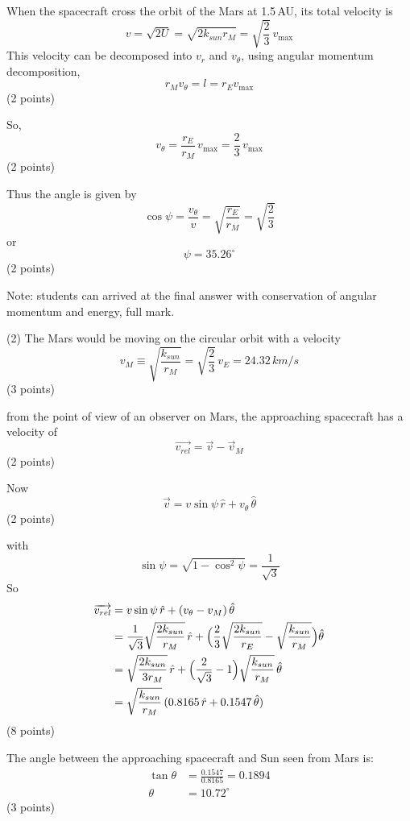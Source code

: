 When the spacecraft cross the orbit of the Mars at 1.5\,AU, its total velocity
is
\[
  v = \sqrt{2U} = \sqrt{2k_{sun}r_M} = \sqrt{\frac{2}{3}}\,v_{\max}
\]
This velocity can be decomposed into $v_r$ and $v_\theta$, using angular
momentum decomposition,
\[
  r_M v_\theta = l = r_E v_{\max}
\]
\hfill(2 points)

So,
\[
  v_\theta = \frac{r_E}{r_M}\,v_{\max} = \frac{2}{3}\,v_{\max}
\]
\hfill(2 points)

Thus the angle is given by
\[
  \cos\psi = \frac{v_\theta}{v} = \sqrt{\frac{r_E}{r_M}} = \sqrt{\frac{2}{3}}
\]
or
\[
  \psi = 35.26^\circ
\]
\hfill(2 points)

Note: students can arrived at the final answer with conservation of angular
momentum and energy, full mark.

(2) The Mars would be moving on the circular orbit with a velocity
\[
  v_M \equiv \sqrt{\frac{k_{sun}}{r_M}} = \sqrt{\frac{2}{3}}\,v_E
  = 24.32\,km/s
\]
\hfill(3 points)

from the point of view of an observer on Mars, the approaching spacecraft has
a velocity of
\[
  \overrightarrow{v_{rel}} = \vec{v} - \vec{v}_M
\]
\hfill(2 points)

Now
\[
  \vec{v} = v\sin\psi\,\hat{r} + v_\theta\,\hat{\theta}
\]
\hfill(2 points)

with
\[
  \sin\psi = \sqrt{1 - \cos^2\psi} = \frac{1}{\sqrt{3}}
\]
So
\begin{align*}
  \overrightarrow{v_{rel}}
  &= v\sin\psi\,\hat{r} + (v_\theta - v_M)\,\hat{\theta} \\
  &= \frac{1}{\sqrt{3}}\sqrt{\frac{2k_{sun}}{r_M}}\,\hat{r}
   + \Bigl(\frac{2}{3}\sqrt{\frac{2k_{sun}}{r_E}}
   - \sqrt{\frac{k_{sun}}{r_M}}\Bigr)\hat{\theta} \\
  &= \sqrt{\frac{2k_{sun}}{3r_M}}\,\hat{r}
   + \Bigl(\frac{2}{\sqrt{3}} - 1\Bigr)\sqrt{\frac{k_{sun}}{r_M}}\,\hat{\theta} \\
  &= \sqrt{\frac{k_{sun}}{r_M}}\,(0.8165\,\hat{r} + 0.1547\,\hat{\theta})
\end{align*}
\hfill(8 points)

The angle between the approaching spacecraft and Sun seen from Mars is:
\begin{align*}
  \tan\theta &= \frac{0.1547}{0.8165} = 0.1894 \\
  \theta &= 10.72^\circ
\end{align*}
\hfill(3 points)


